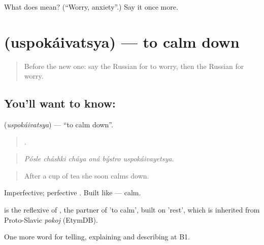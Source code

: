 \begin{tcolorbox}[breakable,colback=teal!4,colframe=teal!35!black,title={Before you move on}]
What does  mean? (\textquotedblleft{}Worry, anxiety\textquotedblright{}.) Say it once more.
\end{tcolorbox}
\section[\texorpdfstring{\ru{успокаиваться} (uspokáivatsya)}{успокаиваться (uspokáivatsya)}]{ (uspokáivatsya) — to calm down}

\label{lesson:RU-C474-uspokaivatsya}



\begin{quote}
Before the new one: say the Russian for to worry, then the Russian for worry.
\end{quote}

\subsection*{You'll want to know: }
\textbf{} (\emph{uspokáivatsya}) — \textquotedblleft{}to calm down\textquotedblright{}.

\begin{quote}
     .
\end{quote}

\begin{quote}
\emph{Pósle cháshki cháya oná býstro uspokáivayetsya.}
\end{quote}

\begin{quote}
After a cup of tea she soon calms down.
\end{quote}

Imperfective; perfective . Built like \emph{} — calm.

\begin{cousinweb}
\emph{} is the reflexive of \emph{}, the partner of \emph{} 'to calm', built on \emph{} 'rest', which is inherited from Proto-Slavic \emph{pokoj} (EtymDB).
\end{cousinweb}

\begin{grammarlens}[title={What you've built}]
One more word for telling, explaining and describing at B1.
\end{grammarlens}

